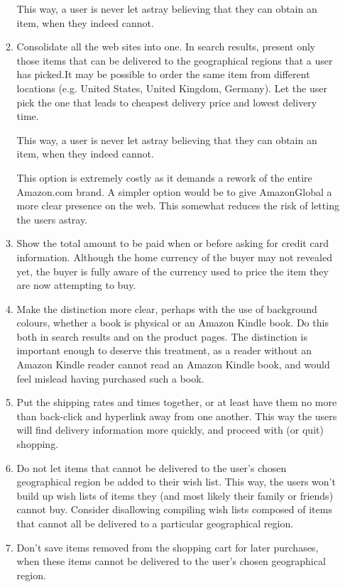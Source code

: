 \begin{enumerate}[a.]
\begin{enumerate}[1.]
This way, a user is never let astray believing that they can obtain an item,
when they indeed cannot.

\item Consolidate all the web sites into one. In search results, present only
those items that can be delivered to the geographical regions that a user has
picked.It may be possible to order the same item from different locations (e.g.
United States, United Kingdom, Germany). Let the user pick the one that leads
to cheapest delivery price and lowest delivery time.

This way, a user is never let astray believing that they can obtain an item,
when they indeed cannot.

This option is extremely costly as it demands a rework of the entire Amazon.com
brand. A simpler option would be to give AmazonGlobal a more clear presence on
the web. This somewhat reduces the risk of letting the users astray.

\item Show the total amount to be paid when or before asking for credit card
information.  Although the home currency of the buyer may not revealed yet, the
buyer is fully aware of the currency used to price the item they are now
attempting to buy.

\item Make the distinction more clear, perhaps with the use of background
colours, whether a book is physical or an Amazon Kindle book. Do this both in
search results and on the product pages. The distinction is important enough to
deserve this treatment, as a reader without an Amazon Kindle reader cannot read
an Amazon Kindle book, and would feel mislead having purchased such a book.

\item Put the shipping rates and times together, or at least have them no more
than back-click and hyperlink away from one another. This way the users will
find delivery information more quickly, and proceed with (or quit) shopping.

\item Do not let items that cannot be delivered to the user's chosen
geographical region be added to their wish list. This way, the users won't
build up wish lists of items they (and most likely their family or friends)
cannot buy. Consider disallowing compiling wish lists composed of items that
cannot all be delivered to a particular geographical region.

\item Don't save items removed from the shopping cart for later purchases, when
these items cannot be delivered to the user's chosen geographical region.


\end{enumerate}
\end{enumerate}
